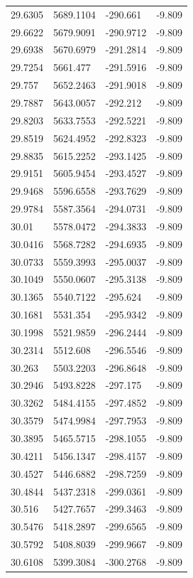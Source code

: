 \begin{table}[H]
\begin{tabular}{llll}
29.6305 & 5689.1104 & -290.661 & -9.809 \\
29.6622 & 5679.9091 & -290.9712 & -9.809 \\
29.6938 & 5670.6979 & -291.2814 & -9.809 \\
29.7254 & 5661.477 & -291.5916 & -9.809 \\
29.757 & 5652.2463 & -291.9018 & -9.809 \\
29.7887 & 5643.0057 & -292.212 & -9.809 \\
29.8203 & 5633.7553 & -292.5221 & -9.809 \\
29.8519 & 5624.4952 & -292.8323 & -9.809 \\
29.8835 & 5615.2252 & -293.1425 & -9.809 \\
29.9151 & 5605.9454 & -293.4527 & -9.809 \\
29.9468 & 5596.6558 & -293.7629 & -9.809 \\
29.9784 & 5587.3564 & -294.0731 & -9.809 \\
30.01 & 5578.0472 & -294.3833 & -9.809 \\
30.0416 & 5568.7282 & -294.6935 & -9.809 \\
30.0733 & 5559.3993 & -295.0037 & -9.809 \\
30.1049 & 5550.0607 & -295.3138 & -9.809 \\
30.1365 & 5540.7122 & -295.624 & -9.809 \\
30.1681 & 5531.354 & -295.9342 & -9.809 \\
30.1998 & 5521.9859 & -296.2444 & -9.809 \\
30.2314 & 5512.608 & -296.5546 & -9.809 \\
30.263 & 5503.2203 & -296.8648 & -9.809 \\
30.2946 & 5493.8228 & -297.175 & -9.809 \\
30.3262 & 5484.4155 & -297.4852 & -9.809 \\
30.3579 & 5474.9984 & -297.7953 & -9.809 \\
30.3895 & 5465.5715 & -298.1055 & -9.809 \\
30.4211 & 5456.1347 & -298.4157 & -9.809 \\
30.4527 & 5446.6882 & -298.7259 & -9.809 \\
30.4844 & 5437.2318 & -299.0361 & -9.809 \\
30.516 & 5427.7657 & -299.3463 & -9.809 \\
30.5476 & 5418.2897 & -299.6565 & -9.809 \\
30.5792 & 5408.8039 & -299.9667 & -9.809 \\
30.6108 & 5399.3084 & -300.2768 & -9.809 \\

\end{tabular}
\end{table}

